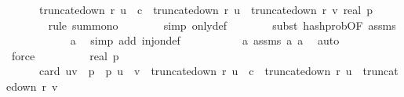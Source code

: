 \begin{isabellebody}
\ \ \ \ \ \ truncate{\isacharunderscore}{\kern0pt}down\ r\ u\ {\isasymle}\ c\ {\isasymand}\ truncate{\isacharunderscore}{\kern0pt}down\ r\ u\ {\isacharequal}{\kern0pt}\ truncate{\isacharunderscore}{\kern0pt}down\ r\ v{\isacharbraceright}{\kern0pt}{\isachardot}{\kern0pt}\ {}{\isacharslash}{\kern0pt}{\isacharparenleft}{\kern0pt}real\ p{\isacharparenright}{\kern0pt}\isanewline
\ \ \ \ \ \ \isamarkupfalse%
\ {\isacharparenleft}{\kern0pt}rule\ sum{\isacharunderscore}{\kern0pt}mono{\isacharparenright}{\kern0pt}\isanewline
\ \ \ \ \ \ \isamarkupfalse%
\ {\isacharparenleft}{\kern0pt}simp\ only{\isacharcolon}{\kern0pt}{\isasymOmega}{\isacharunderscore}{\kern0pt}def{\isacharparenright}{\kern0pt}\isanewline
\ \ \ \ \ \ \isamarkupfalse%
\ {\isacharparenleft}{\kern0pt}subst\ hash{\isacharunderscore}{\kern0pt}prob{\isacharunderscore}{\kern0pt}{}{\isacharbrackleft}{\kern0pt}OF\ assms{\isacharparenleft}{\kern0pt}{}{\isacharparenright}{\kern0pt}{\isacharbrackright}{\kern0pt}{\isacharparenright}{\kern0pt}\isanewline
\ \ \ \ \ \ \ \ \ \ \isamarkupfalse%
\ a{}{\isacharunderscore}{\kern0pt}{}\ \isamarkupfalse%
\ {\isacharparenleft}{\kern0pt}simp\ add{\isacharcolon}{\kern0pt}\ inj{\isacharunderscore}{\kern0pt}on{\isacharunderscore}{\kern0pt}def{\isacharparenright}{\kern0pt}\isanewline
\ \ \ \ \ \ \ \ \ \isamarkupfalse%
\ a{}{\isacharunderscore}{\kern0pt}{}\ assms{\isacharparenleft}{\kern0pt}{}{\isacharparenright}{\kern0pt}\ a{}{\isacharunderscore}{\kern0pt}{}\ a{}{\isacharunderscore}{\kern0pt}{}\ \isamarkupfalse%
\ auto{\isacharbrackleft}{\kern0pt}{}{\isacharbrackright}{\kern0pt}\isanewline
\ \ \ \ \ \ \ \ \ \isamarkupfalse%
\ force{\isacharplus}{\kern0pt}\isanewline
\ \ \ \ \isamarkupfalse%
\ \isamarkupfalse%
\ {\isachardoublequoteopen}{\isachardot}{\kern0pt}{\isachardot}{\kern0pt}{\isachardot}{\kern0pt}\ {\isacharequal}{\kern0pt}\ {}{\isacharslash}{\kern0pt}{\isacharparenleft}{\kern0pt}real\ p{\isacharparenright}{\kern0pt}\ {\isacharasterisk}{\kern0pt}\ \isanewline
\ \ \ \ \ \ card\ {\isacharbraceleft}{\kern0pt}{\isacharparenleft}{\kern0pt}u{\isacharcomma}{\kern0pt}v{\isacharparenright}{\kern0pt}\ {\isasymin}\ {\isacharbraceleft}{\kern0pt}{}{\isachardot}{\kern0pt}{\isachardot}{\kern0pt}{\isacharless}{\kern0pt}p{\isacharbraceright}{\kern0pt}\ {\isasymtimes}\ {\isacharbraceleft}{\kern0pt}{}{\isachardot}{\kern0pt}{\isachardot}{\kern0pt}{\isacharless}{\kern0pt}p{\isacharbraceright}{\kern0pt}{\isachardot}{\kern0pt}\ u\ {\isasymnoteq}\ v\ {\isasymand}\ truncate{\isacharunderscore}{\kern0pt}down\ r\ u\ {\isasymle}\ c\ {\isasymand}\ truncate{\isacharunderscore}{\kern0pt}down\ r\ u\ {\isacharequal}{\kern0pt}\ truncate{\isacharunderscore}{\kern0pt}down\ r\ v{\isacharbraceright}{\kern0pt}{\isachardoublequoteclose}\isanewline

\end{isabellebody}

